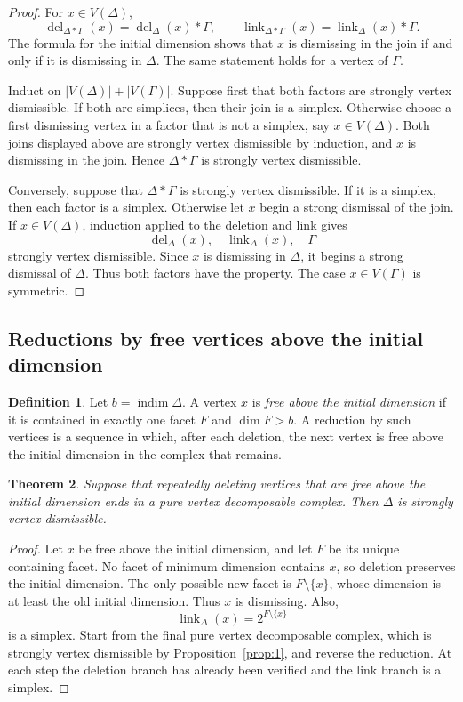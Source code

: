 \documentclass[11pt]{amsart}
\DeclareMathOperator{\indim}{indim}
\DeclareMathOperator{\link}{link}
\DeclareMathOperator{\del}{del}
\newtheorem{theorem}{Theorem}[section]
\theoremstyle{definition}
\newtheorem{definition}[theorem]{Definition}
\begin{document}
	\begin{proof}
		For $x\in V(\Delta)$,
		\[
		\del_{\Delta*\Gamma}(x)=\del_\Delta(x)*\Gamma,
		\qquad
		\link_{\Delta*\Gamma}(x)=\link_\Delta(x)*\Gamma.
		\]
		The formula for the initial dimension shows that $x$ is dismissing in the join if and only if it is dismissing in $\Delta$.  The same statement holds for a vertex of $\Gamma$.
		
		Induct on $|V(\Delta)|+|V(\Gamma)|$.  Suppose first that both factors are strongly vertex dismissible.  If both are simplices, then their join is a simplex.  Otherwise choose a first dismissing vertex in a factor that is not a simplex, say $x\in V(\Delta)$.  Both joins displayed above are strongly vertex dismissible by induction, and $x$ is dismissing in the join.  Hence $\Delta*\Gamma$ is strongly vertex dismissible.
		
		Conversely, suppose that $\Delta*\Gamma$ is strongly vertex dismissible.  If it is a simplex, then each factor is a simplex.  Otherwise let $x$ begin a strong dismissal of the join.  If $x\in V(\Delta)$, induction applied to the deletion and link gives
		\[
		\del_\Delta(x),\quad \link_\Delta(x),\quad \Gamma
		\]
		strongly vertex dismissible.  Since $x$ is dismissing in $\Delta$, it begins a strong dismissal of $\Delta$.  Thus both factors have the property.  The case $x\in V(\Gamma)$ is symmetric.
	\end{proof}
	
	\subsection{Reductions by free vertices above the initial dimension}
	
	\begin{definition}\label{def:3}
		Let $b=\indim\Delta$.  A vertex $x$ is \emph{free above the initial dimension} if it is contained in exactly one facet $F$ and $\dim F>b$.  A reduction by such vertices is a sequence in which, after each deletion, the next vertex is free above the initial dimension in the complex that remains.
	\end{definition}
	
	\begin{theorem}\label{thm:2}
		Suppose that repeatedly deleting vertices that are free above the initial dimension ends in a pure vertex decomposable complex.  Then $\Delta$ is strongly vertex dismissible.
	\end{theorem}
	
	\begin{proof}
		Let $x$ be free above the initial dimension, and let $F$ be its unique containing facet.  No facet of minimum dimension contains $x$, so deletion preserves the initial dimension.  The only possible new facet is $F\setminus\{x\}$, whose dimension is at least the old initial dimension.  Thus $x$ is dismissing. Also,
		\[
		\link_\Delta(x)=2^{F\setminus\{x\}}
		\]
		is a simplex.  Start from the final pure vertex decomposable complex, which is strongly vertex dismissible by Proposition~\ref{prop:1}, and reverse the reduction.  At each step the deletion branch has already been verified and the link branch is a simplex.
	\end{proof}
	
\end{document}
